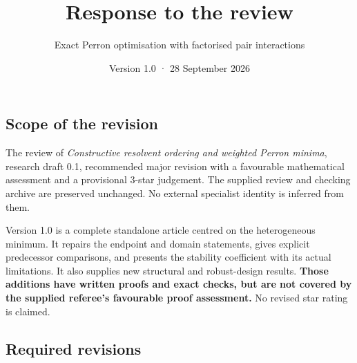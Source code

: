\documentclass[
  11pt,
  a4paper,
]{article}
\title{Response to the review}
\subtitle{Exact Perron optimisation with factorised pair interactions}
\author{}
\date{Version 1.0 · 28 September 2026}
\begin{document}
\maketitle

\subsection{Scope of the revision}\label{scope-of-the-revision}

The review of \emph{Constructive resolvent ordering and weighted Perron
minima}, research draft 0.1, recommended major revision with a
favourable mathematical assessment and a provisional 3-star judgement.
The supplied review and checking archive are preserved unchanged. No
external specialist identity is inferred from them.

Version 1.0 is a complete standalone article centred on the
heterogeneous minimum. It repairs the endpoint and domain statements,
gives explicit predecessor comparisons, and presents the stability
coefficient with its actual limitations. It also supplies new structural
and robust-design results. \textbf{Those additions have written proofs
and exact checks, but are not covered by the supplied referee's
favourable proof assessment.} No revised star rating is claimed.

\subsection{Required revisions}\label{required-revisions}
\end{document}
